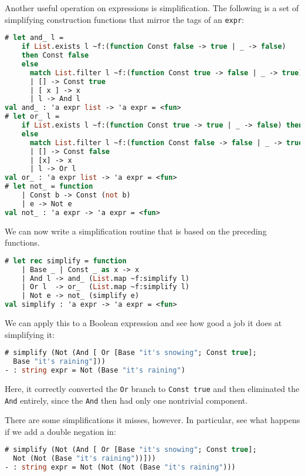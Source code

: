 Another useful operation on expressions is simplification. The following
is a set of simplifying construction functions that mirror the tags of
an \passthrough{\lstinline!expr!}:

\begin{lstlisting}[language=Caml]
# let and_ l =
    if List.exists l ~f:(function Const false -> true | _ -> false)
    then Const false
    else
      match List.filter l ~f:(function Const true -> false | _ -> true) with
      | [] -> Const true
      | [ x ] -> x
      | l -> And l
val and_ : 'a expr list -> 'a expr = <fun>
# let or_ l =
    if List.exists l ~f:(function Const true -> true | _ -> false) then Const true
    else
      match List.filter l ~f:(function Const false -> false | _ -> true) with
      | [] -> Const false
      | [x] -> x
      | l -> Or l
val or_ : 'a expr list -> 'a expr = <fun>
# let not_ = function
    | Const b -> Const (not b)
    | e -> Not e
val not_ : 'a expr -> 'a expr = <fun>
\end{lstlisting}

We can now write a simplification routine that is based on the preceding
functions.

\begin{lstlisting}[language=Caml]
# let rec simplify = function
    | Base _ | Const _ as x -> x
    | And l -> and_ (List.map ~f:simplify l)
    | Or l  -> or_  (List.map ~f:simplify l)
    | Not e -> not_ (simplify e)
val simplify : 'a expr -> 'a expr = <fun>
\end{lstlisting}

We can apply this to a Boolean expression and see how good a job it does
at simplifying it:

\begin{lstlisting}[language=Caml]
# simplify (Not (And [ Or [Base "it's snowing"; Const true];
  Base "it's raining"]))
- : string expr = Not (Base "it's raining")
\end{lstlisting}

Here, it correctly converted the \passthrough{\lstinline!Or!} branch to
\passthrough{\lstinline!Const true!} and then eliminated the
\passthrough{\lstinline!And!} entirely, since the
\passthrough{\lstinline!And!} then had only one nontrivial component.

There are some simplifications it misses, however. In particular, see
what happens if we add a double negation in:

\begin{lstlisting}[language=Caml]
# simplify (Not (And [ Or [Base "it's snowing"; Const true];
  Not (Not (Base "it's raining"))]))
- : string expr = Not (Not (Not (Base "it's raining")))
\end{lstlisting}

